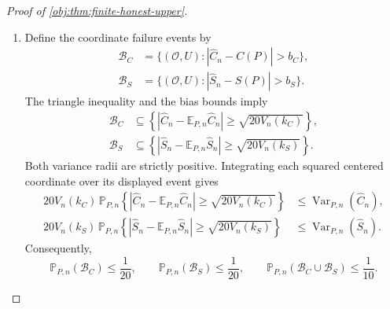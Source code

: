 \documentclass[11pt]{article}
\begin{document}
\begin{proof}[Proof of \cref{obj:thm:finite-honest-upper}]
\begin{enumerate}
\item Define the coordinate failure events by
\[
\begin{aligned}
\mathcal B_C
&=\{(\mathcal O,U):|\widehat C_n-C(P)|>b_C\},\\
\mathcal B_S
&=\{(\mathcal O,U):|\widehat S_n-S(P)|>b_S\}.
\end{aligned}
\]
The triangle inequality and the bias bounds imply
\[
\begin{aligned}
\mathcal B_C
&\subseteq
\left\{
|\widehat C_n-\mathbb E_{P,n}\widehat C_n|
\ge\sqrt{20V_n(k_C)}
\right\},\\
\mathcal B_S
&\subseteq
\left\{
|\widehat S_n-\mathbb E_{P,n}\widehat S_n|
\ge\sqrt{20V_n(k_S)}
\right\}.
\end{aligned}
\]
Both variance radii are strictly positive. Integrating each squared centered coordinate over its displayed event gives
\[
\begin{aligned}
20V_n(k_C)\,
\mathbb P_{P,n}
\left\{
|\widehat C_n-\mathbb E_{P,n}\widehat C_n|
\ge\sqrt{20V_n(k_C)}
\right\}
&\le\operatorname{Var}_{P,n}(\widehat C_n),\\
20V_n(k_S)\,
\mathbb P_{P,n}
\left\{
|\widehat S_n-\mathbb E_{P,n}\widehat S_n|
\ge\sqrt{20V_n(k_S)}
\right\}
&\le\operatorname{Var}_{P,n}(\widehat S_n).
\end{aligned}
\]
Consequently,
\[
\mathbb P_{P,n}(\mathcal B_C)\le\frac1{20},
\qquad
\mathbb P_{P,n}(\mathcal B_S)\le\frac1{20},
\qquad
\mathbb P_{P,n}(\mathcal B_C\cup\mathcal B_S)\le\frac1{10}.
\]


\end{enumerate}
\end{proof}
\end{document}
